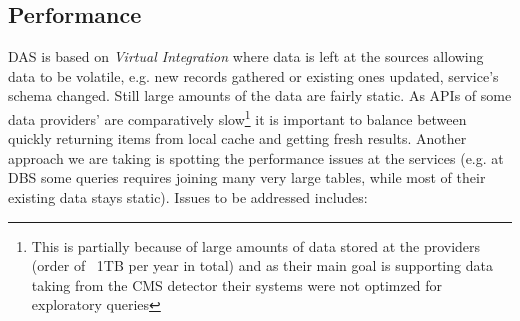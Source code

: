        
\subsection{Performance}

DAS is based on \textit{Virtual Integration} where data is left at the sources allowing data to be volatile, e.g. new records gathered or existing ones updated, service's schema changed. Still large amounts of the data are fairly static. 
As APIs of some data providers' are comparatively slow\footnote{This is partially because of large amounts of data stored at the providers (order of ~1TB per year in total) and as their main goal is supporting data taking from the CMS detector their systems were not optimzed for exploratory queries} it is important to balance between quickly returning items from local cache and getting fresh results. Another approach we are taking is spotting the performance issues at the services (e.g. at DBS some queries requires joining many very large tables, while most of their existing data stays static).
%
Issues to be addressed includes:
